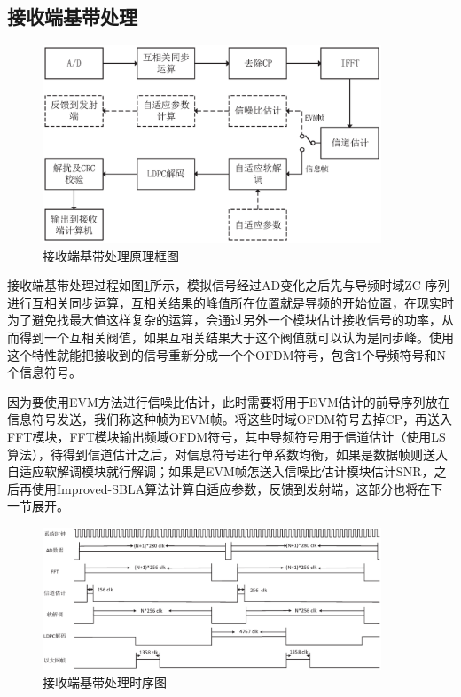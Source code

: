 \subsection{接收端基带处理}
\begin{figure}[htbp]
\centering
\includegraphics[width=0.9\textwidth]{figures/chapter-5/ReciverSchematic.eps}
\caption{接收端基带处理原理框图}
\label{fig:ReciverSchematic}
\end{figure}
接收端基带处理过程如图\ref{fig:ReciverSchematic}所示，模拟信号经过AD变化之后先与导频时域ZC 序列进行互相关同步运算，互相关结果的峰值所在位置就是导频的开始位置，在现实时为了避免找最大值这样复杂的运算，会通过另外一个模块估计接收信号的功率，从而得到一个互相关阀值，如果互相关结果大于这个阀值就可以认为是同步峰。使用这个特性就能把接收到的信号重新分成一个个OFDM符号，包含1个导频符号和N个信息符号。

因为要使用EVM方法进行信噪比估计，此时需要将用于EVM估计的前导序列放在信息符号发送，我们称这种帧为EVM帧。将这些时域OFDM符号去掉CP，再送入FFT模块，FFT模块输出频域OFDM符号，其中导频符号用于信道估计（使用LS算法），待得到信道估计之后，对信息符号进行单系数均衡，如果是数据帧则送入自适应软解调模块就行解调；如果是EVM帧怎送入信噪比估计模块估计SNR，之后再使用Improved-SBLA算法计算自适应参数，反馈到发射端，这部分也将在下一节展开。
\begin{figure}[htbp]
\centering
\includegraphics[width=0.9\textwidth]{figures/chapter-5/TimeSchemeRece.eps}
\caption{接收端基带处理时序图}
\label{fig:TransmitterSchematic}
\end{figure}

